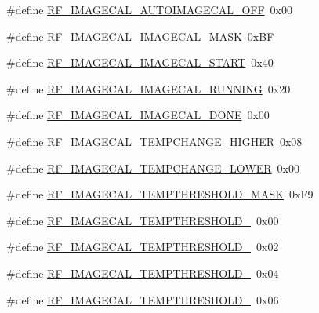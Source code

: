 \begin{DoxyCompactItemize}
\item 
\#define \hyperlink{sx1276Regs-Fsk_8h_a1d28367a9a8e92bb14f6cdf8347d581d}{R\+F\+\_\+\+I\+M\+A\+G\+E\+C\+A\+L\+\_\+\+A\+U\+T\+O\+I\+M\+A\+G\+E\+C\+A\+L\+\_\+\+O\+FF}~0x00
\item 
\#define \hyperlink{sx1276Regs-Fsk_8h_a93dde986266fcd5b36345279f7eb2307}{R\+F\+\_\+\+I\+M\+A\+G\+E\+C\+A\+L\+\_\+\+I\+M\+A\+G\+E\+C\+A\+L\+\_\+\+M\+A\+SK}~0x\+BF
\item 
\#define \hyperlink{sx1276Regs-Fsk_8h_af1223b6f247482b1d7327c213b8b0864}{R\+F\+\_\+\+I\+M\+A\+G\+E\+C\+A\+L\+\_\+\+I\+M\+A\+G\+E\+C\+A\+L\+\_\+\+S\+T\+A\+RT}~0x40
\item 
\#define \hyperlink{sx1276Regs-Fsk_8h_a491baca7615a667462dbb91548b46e53}{R\+F\+\_\+\+I\+M\+A\+G\+E\+C\+A\+L\+\_\+\+I\+M\+A\+G\+E\+C\+A\+L\+\_\+\+R\+U\+N\+N\+I\+NG}~0x20
\item 
\#define \hyperlink{sx1276Regs-Fsk_8h_af062b902b4557ff0de124bb91de0cbc7}{R\+F\+\_\+\+I\+M\+A\+G\+E\+C\+A\+L\+\_\+\+I\+M\+A\+G\+E\+C\+A\+L\+\_\+\+D\+O\+NE}~0x00
\item 
\#define \hyperlink{sx1276Regs-Fsk_8h_a03320f56cee8ba418004acafcdd34249}{R\+F\+\_\+\+I\+M\+A\+G\+E\+C\+A\+L\+\_\+\+T\+E\+M\+P\+C\+H\+A\+N\+G\+E\+\_\+\+H\+I\+G\+H\+ER}~0x08
\item 
\#define \hyperlink{sx1276Regs-Fsk_8h_a63c7e38c8fe42a56c9e21141c63ed6fd}{R\+F\+\_\+\+I\+M\+A\+G\+E\+C\+A\+L\+\_\+\+T\+E\+M\+P\+C\+H\+A\+N\+G\+E\+\_\+\+L\+O\+W\+ER}~0x00
\item 
\#define \hyperlink{sx1276Regs-Fsk_8h_a71e92b3a6cabbb3c991d406981b0ca4c}{R\+F\+\_\+\+I\+M\+A\+G\+E\+C\+A\+L\+\_\+\+T\+E\+M\+P\+T\+H\+R\+E\+S\+H\+O\+L\+D\+\_\+\+M\+A\+SK}~0x\+F9
\item 
\#define \hyperlink{sx1276Regs-Fsk_8h_a823732f79cd8fdb0e911e9845eefdfc7}{R\+F\+\_\+\+I\+M\+A\+G\+E\+C\+A\+L\+\_\+\+T\+E\+M\+P\+T\+H\+R\+E\+S\+H\+O\+L\+D\+\_}~0x00
\item 
\#define \hyperlink{sx1276Regs-Fsk_8h_ace08ac63033530d1b78d0902d0563095}{R\+F\+\_\+\+I\+M\+A\+G\+E\+C\+A\+L\+\_\+\+T\+E\+M\+P\+T\+H\+R\+E\+S\+H\+O\+L\+D\+\_}~0x02
\item 
\#define \hyperlink{sx1276Regs-Fsk_8h_ac99967aa7133c5de90e00d89cdb2fc31}{R\+F\+\_\+\+I\+M\+A\+G\+E\+C\+A\+L\+\_\+\+T\+E\+M\+P\+T\+H\+R\+E\+S\+H\+O\+L\+D\+\_}~0x04
\item 
\#define \hyperlink{sx1276Regs-Fsk_8h_a15e6175c8004a9070dc082987c16c8f5}{R\+F\+\_\+\+I\+M\+A\+G\+E\+C\+A\+L\+\_\+\+T\+E\+M\+P\+T\+H\+R\+E\+S\+H\+O\+L\+D\+\_}~0x06
\item 

\end{DoxyCompactItemize}
